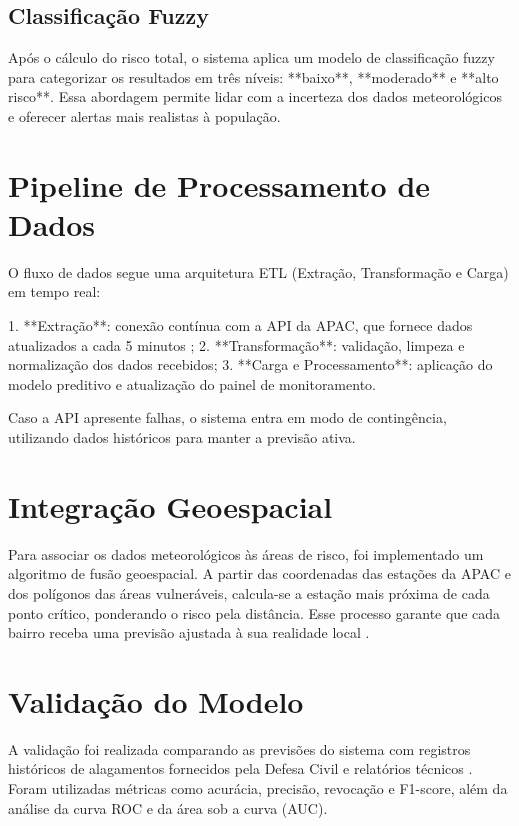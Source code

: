 \subsection{Classificação Fuzzy}

Após o cálculo do risco total, o sistema aplica um modelo de classificação fuzzy para categorizar os resultados em três níveis: **baixo**, **moderado** e **alto risco**. Essa abordagem permite lidar com a incerteza dos dados meteorológicos e oferecer alertas mais realistas à população.

\section{Pipeline de Processamento de Dados}

O fluxo de dados segue uma arquitetura ETL (Extração, Transformação e Carga) em tempo real:

1. **Extração**: conexão contínua com a API da APAC, que fornece dados atualizados a cada 5 minutos \cite{alves_apac};  
2. **Transformação**: validação, limpeza e normalização dos dados recebidos;  
3. **Carga e Processamento**: aplicação do modelo preditivo e atualização do painel de monitoramento.  

Caso a API apresente falhas, o sistema entra em modo de contingência, utilizando dados históricos para manter a previsão ativa.

\section{Integração Geoespacial}

Para associar os dados meteorológicos às áreas de risco, foi implementado um algoritmo de fusão geoespacial. A partir das coordenadas das estações da APAC e dos polígonos das áreas vulneráveis, calcula-se a estação mais próxima de cada ponto crítico, ponderando o risco pela distância. Esse processo garante que cada bairro receba uma previsão ajustada à sua realidade local \cite{domingos2025mapeamento}.

\section{Validação do Modelo}

A validação foi realizada comparando as previsões do sistema com registros históricos de alagamentos fornecidos pela Defesa Civil e relatórios técnicos \cite{carvalho2025sistema}. Foram utilizadas métricas como acurácia, precisão, revocação e F1-score, além da análise da curva ROC e da área sob a curva (AUC).  

